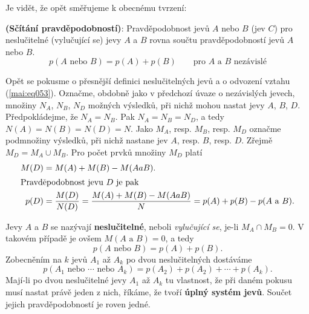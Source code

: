       
      
      Je vidět, že opět směřujeme k obecnému tvrzení:
      \begin{lemma}\label{mai:lemma004}
        \textbf{(Sčítání pravděpodobností)}: Pravděpodobnost jevů \(A\) nebo \(B\) (jev \(C\)) 
        pro neslučitelné (vylučující se) jevy \(A\) a \(B\) rovna součtu pravděpodobností jevů 
        \(A\) nebo \(B\).
        \begin{equation}\label{mai:eq053}
           p(A \text{ nebo } B)= p(A) + p(B)\qquad \text{pro } A \text{ a } B \text{ nezávislé}
        \end{equation}
      \end{lemma}
      
      Opět se pokusme o přesnější definici neslučitelných jevů a o odvození vztahu 
      (\ref{mai:eq053}). Označme, obdobně jako v předchozí úvaze o nezávislých jevech, množiny 
      \(N_A\), \(N_B\), \(N_D\) možných výsledků, při nichž mohou nastat jevy \(A\), \(B\), \(D\). 
      Předpokládejme, že \(N_A = N_B\). Pak \(N_A = N_B = N_D\), a tedy \(N(A) = N(B) = N(D) = N\). 
      Jako \(M_A\), resp. \(M_B\), resp. \(M_D\) označme podmnožiny výsledků, při nichž nastane jev 
      \(A\), resp. \(B\), resp. \(D\). Zřejmě \(M_D = M_A \cup M_B\). Pro počet prvků množiny 
      \(M_D\) platí 
      \begin{align*}
        M(D) &= M(A) + M(B) - M(A a B).                                    \\
        \shortintertext{Pravděpodobnost jevu \(D\) je pak}
        p(D) &= \dfrac{M(D)}{N(D)} = \dfrac{M(A) + M(B) - M(A a B)}{N} 
              = p(A) + p(B) - p(A\text{ a }B).
      \end{align*}
      
      Jevy \(A\) a \(B\) se nazývají \textbf{neslučitelné}, neboli \emph{vylučující se}, je-li 
      \(M_A \cap M_B = 0\). V takovém případě je ovšem \(M(A\text{ a }B) = 0\), a tedy
      \begin{equation*}
        p(A\text{ nebo }B) = p(A) + p(B).
      \end{equation*}
      Zobecněním na \(k\) jevů \(A_1\) až \(A_k\) po dvou neslučitelných dostáváme
      \begin{equation*}
        p(A_1\text{ nebo }\cdots\text{ nebo }A_k) = p(A_2) + p(A_2) + \cdots + p(A_k).
      \end{equation*}
      Mají-li po dvou neslučitelné jevy \(A_1\) až \(A_k\) tu vlastnost, že při daném pokusu musí 
      nastat právě jeden z nich, říkáme, že tvoří \textbf{úplný systém jevů}. Součet jejich 
      pravděpodobností je roven jedné.
      
